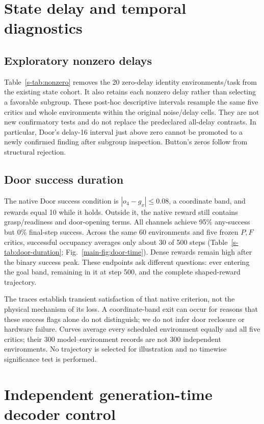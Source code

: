 \section{State delay and temporal diagnostics}
\subsection{Exploratory nonzero delays}
\label{s-sec:nonzero}
Table~\ref{s-tab:nonzero} removes the 20 zero-delay identity environments/task from the existing state cohort. It also retains each nonzero delay rather than selecting a favorable subgroup. These post-hoc descriptive intervals resample the same five critics and whole environments within the original noise/delay cells. They are not new confirmatory tests and do not replace the predeclared all-delay contrasts. In particular, Door's delay-16 interval just above zero cannot be promoted to a newly confirmed finding after subgroup inspection. Button's zeros follow from structural rejection.



\subsection{Door success duration}
\label{s-sec:temporal}
The native Door success condition is $|o_4-g_x|\leq0.08$, a coordinate band, and rewards equal 10 while it holds. Outside it, the native reward still contains grasp/readiness and door-opening terms. All channels achieve 95\% any-success but 0\% final-step success. Across the same 60 environments and five frozen $P,F$ critics, successful occupancy averages only about 30 of 500 steps (Table~\ref{s-tab:door-duration}; Fig.~\ref{main-fig:door-time}). Dense rewards remain high after the binary success peak. These endpoints ask different questions: ever entering the goal band, remaining in it at step 500, and the complete shaped-reward trajectory.

The traces establish transient satisfaction of that native criterion, not the physical mechanism of its loss. A coordinate-band exit can occur for reasons that these success flags alone do not distinguish; we do not infer door reclosure or hardware failure. Curves average every scheduled environment equally and all five critics; their 300 model--environment records are not 300 independent environments. No trajectory is selected for illustration and no timewise significance test is performed.




\section{Independent generation-time decoder control}\label{s-sec:decoder}

